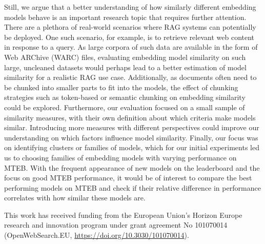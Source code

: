 \documentclass[nonacm,sigconf]{acmart}
\begin{document}
Still, we argue that a better understanding of how similarly different embedding models behave is an important research topic that requires further attention. There are a plethora of real-world scenarios where RAG systems can potentially be deployed. One such scenario, for example, is to retrieve relevant web content in response to a query. As large corpora of such data are available in the form of Web ARChive (WARC) files, evaluating embedding model similarity on such large, uncleaned datasets would perhaps lead to a better estimation of model similarity for a realistic RAG use case. Additionally, as documents often need to be chunked into smaller parts to fit into the models, the effect of chunking strategies such as token-based or semantic chunking on embedding similarity could be explored. Furthermore, our evaluation focused on a small sample of similarity measures, with their own definition about which criteria make models similar. Introducing more measures with different perspectives could improve our understanding on which factors influence model similarity. Finally, our focus was on identifying clusters or families of models, which for our initial experiments led us to choosing families of embedding models with varying performance on MTEB. With the frequent appearance of new models on the leaderboard and the focus on good MTEB performance, it would be of interest to compare the best performing models on MTEB and check if their relative difference in performance correlates with how similar these models are.

\begin{acks}
This work has received funding from the European Union's Horizon Europe research and innovation program under grant agreement No 101070014 (OpenWebSearch.EU, \url{https://doi.org/10.3030/101070014}).
\end{acks}




\end{document}
